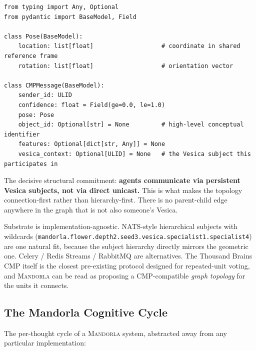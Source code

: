 \documentclass[11pt,a4paper]{article}
\begin{document}
\begin{lstlisting}
from typing import Any, Optional
from pydantic import BaseModel, Field

class Pose(BaseModel):
    location: list[float]                   # coordinate in shared reference frame
    rotation: list[float]                   # orientation vector

class CMPMessage(BaseModel):
    sender_id: ULID
    confidence: float = Field(ge=0.0, le=1.0)
    pose: Pose
    object_id: Optional[str] = None         # high-level conceptual identifier
    features: Optional[dict[str, Any]] = None
    vesica_context: Optional[ULID] = None   # the Vesica subject this participates in
\end{lstlisting}

The decisive structural commitment: \textbf{agents communicate via persistent Vesica subjects, not via direct unicast.} This is what makes the topology connection-first rather than hierarchy-first. There is no parent-child edge anywhere in the graph that is not also someone's Vesica.

Substrate is implementation-agnostic. NATS-style hierarchical subjects with wildcards (\texttt{mandorla.flower.depth2.seed3.vesica.specialist1.specialist4}) are one natural fit, because the subject hierarchy directly mirrors the geometric one. Celery / Redis Streams / RabbitMQ are alternatives. The Thousand Brains CMP itself is the closest pre-existing protocol designed for repeated-unit voting, and \textsc{Mandorla} can be read as proposing a CMP-compatible \emph{graph topology} for the units it connects.

\subsection{The Mandorla Cognitive Cycle}

The per-thought cycle of a \textsc{Mandorla} system, abstracted away from any particular implementation:
\end{document}

